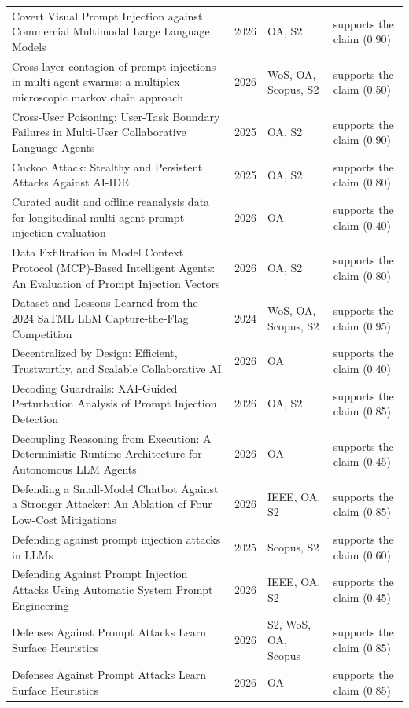 \begin{longtable}{@{}%
  >{\raggedright\arraybackslash}p{}c%
  >{\raggedright\arraybackslash}p{}%
  >{\raggedright\arraybackslash}p{}@{}}
Covert Visual Prompt Injection against Commercial Multimodal Large Language Models & 2026 & OA, S2 & supports the claim (0.90) \\
Cross-layer contagion of prompt injections in multi-agent swarms: a multiplex microscopic markov chain approach & 2026 & WoS, OA, Scopus, S2 & supports the claim (0.50) \\
Cross-User Poisoning: User-Task Boundary Failures in Multi-User Collaborative Language Agents & 2025 & OA, S2 & supports the claim (0.90) \\
Cuckoo Attack: Stealthy and Persistent Attacks Against AI-IDE & 2025 & OA, S2 & supports the claim (0.80) \\
Curated audit and offline reanalysis data for longitudinal multi-agent prompt-injection evaluation & 2026 & OA & supports the claim (0.40) \\
Data Exfiltration in Model Context Protocol (MCP)-Based Intelligent Agents: An Evaluation of Prompt Injection Vectors & 2026 & OA, S2 & supports the claim (0.80) \\
Dataset and Lessons Learned from the 2024 SaTML LLM Capture-the-Flag Competition & 2024 & WoS, OA, Scopus, S2 & supports the claim (0.95) \\
Decentralized by Design: Efficient, Trustworthy, and Scalable Collaborative AI & 2026 & OA & supports the claim (0.40) \\
Decoding Guardrails: XAI-Guided Perturbation Analysis of Prompt Injection Detection & 2026 & OA, S2 & supports the claim (0.85) \\
Decoupling Reasoning from Execution: A Deterministic Runtime Architecture for Autonomous LLM Agents & 2026 & OA & supports the claim (0.45) \\
Defending a Small-Model Chatbot Against a Stronger Attacker: An Ablation of Four Low-Cost Mitigations & 2026 & IEEE, OA, S2 & supports the claim (0.85) \\
Defending against prompt injection attacks in LLMs & 2025 & Scopus, S2 & supports the claim (0.60) \\
Defending Against Prompt Injection Attacks Using Automatic System Prompt Engineering & 2026 & IEEE, OA, S2 & supports the claim (0.45) \\
Defenses Against Prompt Attacks Learn Surface Heuristics & 2026 & S2, WoS, OA, Scopus & supports the claim (0.85) \\
Defenses Against Prompt Attacks Learn Surface Heuristics & 2026 & OA & supports the claim (0.85) \\

\end{longtable}
